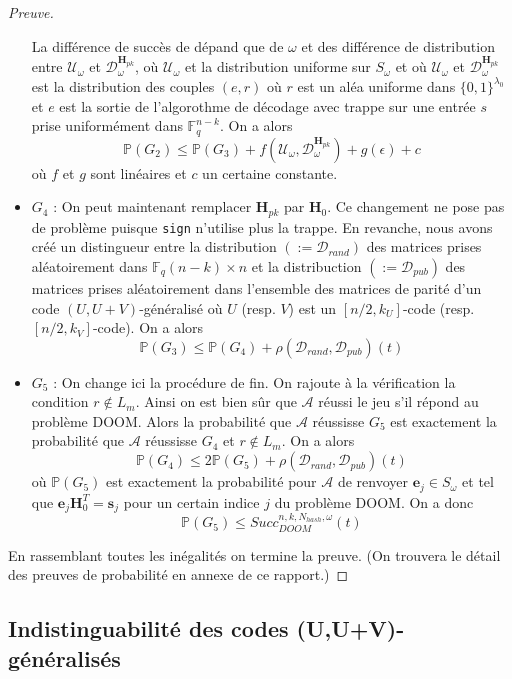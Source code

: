 \documentclass[12pt]{article}
\theoremstyle{plain}
\newcommand{\F}{\mathbb{F}}
\newcommand{\A}{\mathcal{A}}
\newcommand{\e}{\mathbf{e}}
\newcommand{\s}{\mathbf{s}}
\begin{document}
\begin{proof}[Preuve]
\begin{itemize}
 La différence de succès de dépand que de $\omega$ et des différence de distribution entre $\mathcal{U}_{\omega}$ et $\mathcal{D}_{\omega}^{\mathbf{H}_{pk}}$, où $\mathcal{U}_{\omega}$ et la distribution uniforme sur $S_{\omega}$ et où $\mathcal{U}_{\omega}$ et $\mathcal{D}_{\omega}^{\mathbf{H}_{pk}}$ est la distribution des couples $(e,r)$ où $r$ est un aléa uniforme dans $\{0,1\}^{\lambda_0}$ et $e$ est la sortie de l'algorothme de décodage avec trappe sur une entrée $s$ prise uniformément dans $\F_q^{n-k}$.
On a alors 
$$ \mathbb{P}(G_2) \leq  \mathbb{P}(G_3) + f(\mathcal{U}_{\omega},\mathcal{D}_{\omega}^{\mathbf{H}_{pk}}) + g(\epsilon) + c$$
où $f$ et $g$ sont linéaires et $c$ un certaine constante.
\item $G_4$ : On peut maintenant remplacer $\mathbf{H}_{pk}$ par $\mathbf{H}_0$. Ce changement ne pose pas de problème puisque \verb|sign| n'utilise plus la trappe. En revanche, nous avons créé un distingueur entre la distribution $(:=\mathcal{D}_{rand})$ des matrices prises aléatoirement dans $\F_q{(n-k)\times n}$ et la distribuction $(:=\mathcal{D}_{pub})$ des matrices prises aléatoirement dans l'ensemble des matrices de parité d'un code $(U,U+V)$-généralisé où $U$ (resp. $V$) est un $[n/2,k_U]$-code (resp. $[n/2,k_V]$-code). 
On a alors 
$$ \mathbb{P}(G_3) \leq  \mathbb{P}(G_4) + \rho(\mathcal{D}_{rand},\mathcal{D}_{pub})(t)$$
\item $G_5$ : On change ici la procédure de fin. On rajoute à la vérification la condition $r \notin L_m$. Ainsi on est bien sûr que $\A$ réussi le jeu s'il répond au problème DOOM. Alors la probabilité que $\A$ réussisse $G_5$ est exactement la probabilité que $\A$ réussisse $G_4$ et $r\notin L_m$.
On a alors 
$$ \mathbb{P}(G_4) \leq  2\mathbb{P}(G_5) + \rho(\mathcal{D}_{rand},\mathcal{D}_{pub})(t)$$
où $\mathbb{P}(G_5)$ est exactement la probabilité pour $\A$ de renvoyer $\e_j \in S_{\omega}$ et tel que $\e_j\mathbf{H}_0^T = \s_j$ pour un certain indice $j$ du problème DOOM. On a donc 
$$ \mathbb{P}(G_5) \leq Succ^{n,k,N_{hash}, \omega}_{DOOM}(t)$$
\end{itemize}
En rassemblant toutes les inégalités on termine la preuve. (On trouvera le détail des preuves de probabilité en annexe de ce rapport.)
\end{proof}


\subsection{Indistinguabilité des codes (U,U+V)-généralisés}
\end{document}
